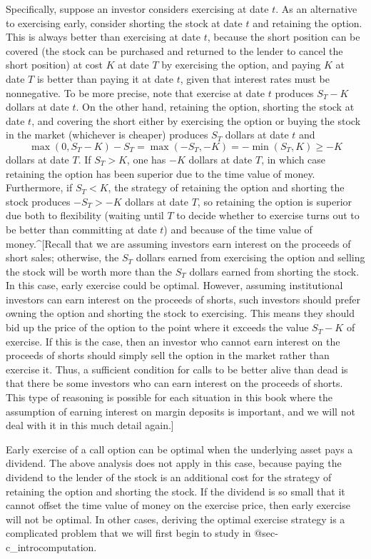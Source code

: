 Specifically, suppose an investor considers exercising at date $t$.  As an alternative to exercising early, consider shorting the stock at date $t$ and retaining the option.  This is always better than exercising at date $t$, because the short position can  be covered (the stock can be purchased and returned to the lender to cancel the short position) at cost $K$ at date $T$ by exercising the option, and paying $K$ at date $T$ is better than paying it at date $t$, given that interest rates must be nonnegative.  To be more precise, note that exercise at date $t$ produces  $S_T-K$ dollars at date $t$.  On the other hand, retaining the option, shorting the stock at date $t$, and covering the short either by exercising the option or buying the stock in the market (whichever is cheaper) produces $S_T$ dollars at date $t$ and 
$$\max(0,S_T-K) - S_T = \max(-S_T, -K) = -\min(S_T,K) \geq -K$$
dollars at date $T$.  If $S_T>K$, one has $-K$ dollars at date $T$, in which case retaining the option has been superior due to the time value of money.  Furthermore,  if $S_T<K$, the strategy of retaining the option and shorting the stock produces $-S_T > -K$ dollars at date $T$, so retaining the option is superior due both to flexibility (waiting until $T$ to decide whether to exercise turns out to be better than committing at date $t$) and because of the time value of money.^[Recall that we are assuming investors earn interest on the proceeds of short sales; otherwise, the $S_T$ dollars earned from exercising the option and selling the stock will be worth more than the $S_T$ dollars earned from shorting the stock.  In this case, early exercise could be optimal.  However, assuming institutional investors can earn interest on the proceeds of shorts,  such investors should prefer owning the option and shorting the stock to exercising.  This means  they should bid up the price of the option to the point where it exceeds the value $S_T-K$ of exercise.  If this is the case, then an investor who cannot earn interest on the proceeds of shorts should simply sell the option in the market rather than exercise it.  Thus, a sufficient condition for calls to be better alive than dead is that there be some investors who can earn interest on the proceeds of shorts.  This type of reasoning is possible for each situation in this book where the assumption of earning interest on margin deposits is important, and we will not deal with it in this much detail again.]

Early exercise of a call option can be optimal when the underlying asset pays a dividend.  The above analysis does not apply in this case, because paying the dividend to the lender of the stock is an additional cost for the strategy of retaining the option and shorting the stock.  If the dividend is so small that it cannot offset the time value of money on the exercise price, then early exercise will not be optimal.  In other cases, deriving the optimal exercise strategy is a complicated problem that we will first begin to study in @sec-c_introcomputation.

